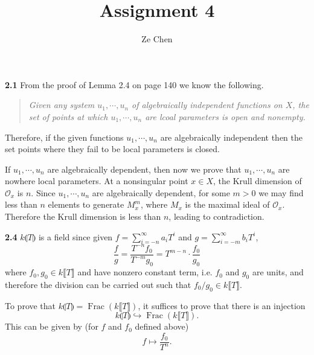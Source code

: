 \documentclass{article}
\title{Assignment 4}
\author{Ze Chen}
\makeatletter
\newcommand*{\shifttext}[1]{%
  \settowidth{\@tempdima}{#1}%
  \hspace{-\@tempdima}#1%
}
\newcommand{\plabel}[1]{%
\shifttext{\textbf{#1}\quad}%
}
\newcommand{\prule}{%
\begin{center}%
\hdashrule[0.5ex]{.99\linewidth}{1pt}{1pt 2.5pt}%
\end{center}%
}
\makeatother
\begin{document}
\maketitle

\plabel{2.1}%
From the proof of Lemma 2.4 on page 140 we know the following.
\begin{quote}
    \textit{%
    Given any system $u_1,\cdots,u_n$ of algebraically independent functions on $X$, the set of points at which $u_1,\cdots,u_n$ are lcoal parameters is open and nonempty.}
\end{quote}
Therefore, if the given functions $u_1,\cdots,u_n$ are algebraically independent then the set points where they fail to be local parameters is closed.
\par
If $u_1,\cdots,u_n$ are algebraically dependent, then now we prove that $u_1,\cdots,u_n$ are nowhere local parameters.
At a nonsingular point $x\in X$, the Krull dimension of $\mathcal{O}_x$ is $n$.
Since $u_1,\cdots,u_n$ are algebraically dependent, for some $m>0$ we may find less than $n$ elements to generate $M_x^m$, where $M_x$ is the maximal ideal of $\mathcal{O}_x$.
Therefore the Krull dimension is less than $n$, leading to contradiction.

\plabel{2.4}%
$k\llparenthesis  T \rrparenthesis  $ is a field since given $f = \sum_{i=-n}^\infty a_i T^i$ and $g = \sum_{i=-m}^\infty b_i T^i$,
\[ \frac{f}{g} = \frac{T^{-n} f_0}{T^{-m} g_0} = T^{m-n} \cdot \frac{f_0}{g_0} \]
where $f_0,g_0\in k\llbracket T\rrbracket$ and have nonzero constant term, i.e. $f_0$ and $g_0$ are units, and therefore the division can be carried out such that $f_0/g_0\in k\llbracket T\rrbracket$.
\par
To prove that $k\llparenthesis  T \rrparenthesis  = \operatorname{Frac}(k\llbracket T\rrbracket)$, it suffices to prove that there is an injection 
\[ k\llparenthesis  T \rrparenthesis \hookrightarrow \operatorname{Frac}(k\llbracket T\rrbracket). \]
This can be given by (for $f$ and $f_0$ defined above)
\[ f \mapsto \frac{f_0}{T^n}. \]

\prule
\end{document}
